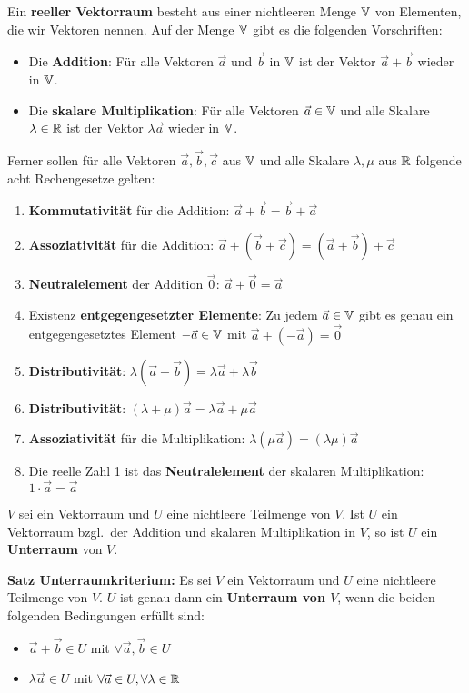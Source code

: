 

Ein \textbf{reeller Vektorraum} besteht aus einer nichtleeren Menge $\mathbb{V}$ von Elementen, die wir Vektoren nennen.
Auf der Menge $\mathbb{V}$ gibt es die folgenden Vorschriften:
\begin{itemize}
    \item Die \textbf{Addition}: Für alle Vektoren $\vec{a}$ und $\vec{b}$ in $\mathbb{V}$ ist der Vektor $\vec{a} + \vec{b}$ wieder in $\mathbb{V}$.
    \item Die \textbf{skalare Multiplikation}: Für alle Vektoren $\vec{a} \in \mathbb{V}$ und alle Skalare $\lambda \in \mathbb{R}$ ist der Vektor $\lambda \vec{a}$ wieder in $\mathbb{V}$.
\end{itemize}
Ferner sollen für alle Vektoren $\vec{a}, \vec{b}, \vec{c}$ aus $\mathbb{V}$ und alle Skalare $\lambda, \mu$ aus $\mathbb{R}$ folgende acht Rechengesetze gelten:
\begin{enumerate}
    \item \textbf{Kommutativität} für die Addition: $\vec{a} + \vec{b} = \vec{b} + \vec{a}$
    \item \textbf{Assoziativität} für die Addition: $\vec{a} + (\vec{b} + \vec{c}) = (\vec{a} + \vec{b}) + \vec{c}$
    \item \textbf{Neutralelement} der Addition $\vec{0}$: $\vec{a} + \vec{0} = \vec{a}$
    \item Existenz \textbf{entgegengesetzter Elemente}: Zu jedem $\vec{a} \in \mathbb{V}$ gibt es genau ein entgegengesetztes Element $-\vec{a} \in \mathbb{V}$ mit $\vec{a} + (-\vec{a}) = \vec{0}$
    \item \textbf{Distributivität}: $\lambda (\vec{a} + \vec{b}) = \lambda \vec{a} + \lambda \vec{b}$
    \item \textbf{Distributivität}: $(\lambda + \mu) \vec{a} = \lambda \vec{a} + \mu \vec{a}$
    \item \textbf{Assoziativität} für die Multiplikation: $\lambda (\mu \vec{a}) = (\lambda \mu) \vec{a}$
    \item Die reelle Zahl 1 ist das \textbf{Neutralelement} der skalaren Multiplikation: $1 \cdot \vec{a} = \vec{a}$
\end{enumerate}


$V$ sei ein Vektorraum und $U$ eine nichtleere Teilmenge von $V$.
Ist $U$ ein Vektorraum bzgl.\ der Addition und skalaren Multiplikation in $V$, so ist $U$ ein \textbf{Unterraum} von $V$.

\textbf{Satz Unterraumkriterium:} Es sei $V$ ein Vektorraum und $U$ eine nichtleere Teilmenge von $V$.
$U$ ist genau dann ein \textbf{Unterraum von $V$}, wenn die beiden folgenden Bedingungen erfüllt sind:
\begin{itemize}
    \item $\vec{a} + \vec{b} \in U$ mit $\forall \vec{a}, \vec{b} \in U$
    \item $\lambda \vec{a} \in U$ mit $\forall \vec{a} \in U, \forall \lambda \in \mathbb{R}$
\end{itemize}

